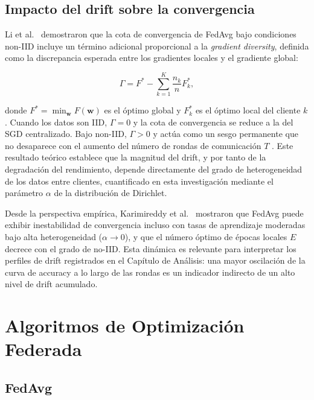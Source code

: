 \subsection{Impacto del drift sobre la convergencia}

Li et al.\ \cite{li2020convergencefedavgnoniiddata} demostraron que la cota de convergencia de
FedAvg bajo condiciones non-IID incluye un término adicional proporcional a la \textit{gradient
diversity}, definida como la discrepancia esperada entre los gradientes locales y el gradiente
global:

\begin{equation}
  \Gamma = F^* - \sum_{k=1}^{K} \frac{n_k}{n} F_k^*,
  \label{eq:diversity}
\end{equation}

donde $F^* = \min_{\mathbf{w}} F(\mathbf{w})$ es el óptimo global y $F_k^*$ es el óptimo
local del cliente $k$. Cuando los datos son IID, $\Gamma = 0$ y la cota de convergencia se
reduce a la del SGD centralizado. Bajo non-IID, $\Gamma > 0$ y actúa como un sesgo permanente
que no desaparece con el aumento del número de rondas de comunicación $T$
\cite{li2020convergencefedavgnoniiddata}. Este resultado teórico establece que la magnitud del drift, y por tanto de la degradación del rendimiento, depende directamente del grado de
heterogeneidad de los datos entre clientes, cuantificado en esta investigación mediante el
parámetro $\alpha$ de la distribución de Dirichlet.

Desde la perspectiva empírica, Karimireddy et al.\ \cite{DBLP:journals/corr/abs-1910-06378}
mostraron que FedAvg puede exhibir inestabilidad de convergencia incluso con tasas de
aprendizaje moderadas bajo alta heterogeneidad ($\alpha \to 0$), y que el número óptimo de
épocas locales $E$ decrece con el grado de no-IID. Esta dinámica es relevante para interpretar
los perfiles de drift registrados en el Capítulo de Análisis: una mayor oscilación de la curva
de accuracy a lo largo de las rondas es un indicador indirecto de un alto nivel de drift
acumulado.

\section{Algoritmos de Optimización Federada}

\subsection{FedAvg}

